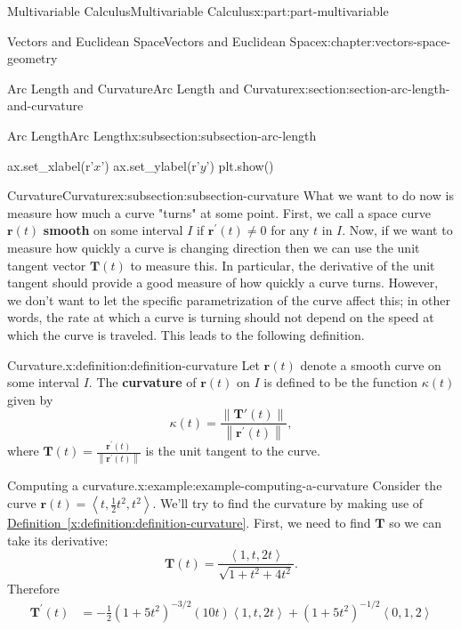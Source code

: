 \documentclass[twoside,10pt,]{tufte-book}
\newcommand{\xreffont}{\relax}
\newcommand{\terminology}[1]{\textbf{#1}}
\numberwithin{equation}{part}
\newcommand{\norm}[1]{\left\| #1 \right\|}
\newcommand{\dotprod}[1]{\left\langle #1 \right\rangle}
\begin{document}
\begin{partptx}{Multivariable Calculus}{}{Multivariable Calculus}{}{}{x:part:part-multivariable}
\begin{chapterptx}{Vectors and Euclidean Space}{}{Vectors and Euclidean Space}{}{}{x:chapter:vectors-space-geometry}
\begin{sectionptx}{Arc Length and Curvature}{}{Arc Length and Curvature}{}{}{x:section:section-arc-length-and-curvature}
\begin{subsectionptx}{Arc Length}{}{Arc Length}{}{}{x:subsection:subsection-arc-length}
\begin{sageinput}
ax.set_xlabel(r'$x$')
ax.set_ylabel(r'$y$')
plt.show()
\end{sageinput}
\end{subsectionptx}
%
%
\typeout{************************************************}
\typeout{************************************************}
%
\begin{subsectionptx}{Curvature}{}{Curvature}{}{}{x:subsection:subsection-curvature}
What we want to do now is measure how much a curve "turns" at some point. First, we call a space curve \(\mathbf{r}(t)\) \terminology{smooth} on some interval \(I\) if \(\mathbf{r}^\prime(t)\neq0\) for any \(t\) in \(I\). Now, if we want to measure how quickly a curve is changing direction then we can use the unit tangent vector \(\mathbf{T}(t)\) to measure this. In particular, the derivative of the unit tangent should provide a good measure of how quickly a curve turns. However, we don't want to let the specific parametrization of the curve affect this; in other words, the rate at which a curve is turning should not depend on the speed at which the curve is traveled. This leads to the following definition.%
\begin{definition}{Curvature.}{x:definition:definition-curvature}%
%
Let \(\mathbf{r}(t)\) denote a smooth curve on some interval \(I\). The \terminology{curvature} of \(\mathbf{r}(t)\) on \(I\) is defined to be the function \(\kappa(t)\) given by%
%
\begin{equation*}
\kappa(t) = \frac{\norm{\mathbf{T}'(t)}}{\norm{\mathbf{r}^\prime(t)}},
\end{equation*}
where \(\mathbf{T}(t) = \frac{\mathbf{r}^\prime(t)}{\norm{\mathbf{r}^\prime(t)}}\) is the unit tangent to the curve.%
\end{definition}
\begin{example}{Computing a curvature.}{x:example:example-computing-a-curvature}%
Consider the curve \(\mathbf{r}(t) = \dotprod{t,\frac{1}{2}t^{2},t^{2}}.\) We'll try to find the curvature by making use of \hyperref[x:definition:definition-curvature]{Definition~{\xreffont\ref{x:definition:definition-curvature}}}. First, we need to find \(\mathbf{T}\) so we can take its derivative:%
%
\begin{equation*}
\mathbf{T}(t) = \frac{\dotprod{1,t,2t}}{\sqrt{1+t^{2}+4t^{2}}}.
\end{equation*}
Therefore%
%
\begin{align*}
\mathbf{T}^\prime(t) & = -\frac{1}{2}(1+5t^{2})^{-3/2}(10t)\dotprod{1,t,2t} + (1+5t^{2})^{-1/2}\dotprod{0,1,2} \\

\end{align*}
\end{example}
\end{subsectionptx}
\end{sectionptx}
\end{chapterptx}
\end{partptx}
\end{document}
